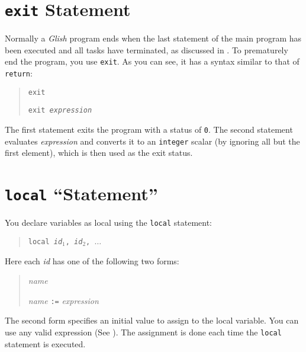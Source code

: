\section{{\tt exit} Statement}
\label{exit-stmt}


Normally a {\em Glish} program ends when the last statement of the main
program has been executed and all tasks have terminated, as discussed
in .   To prematurely
end the program, you use {\tt exit}. 
As you can see, it  has a syntax similar to that
of {\tt return}:
\begin{quote}
    {\tt exit}

    {\tt exit {\em expression}}
\end{quote}
The first statement exits the program with a status of {\tt 0}. The second
statement evaluates {\em expression} and converts it to an {\tt integer} scalar
(by ignoring all but the first element), which is then used as the
exit status.

\section{{\tt local} ``Statement''}
\label{local-stmt}
You declare variables as local using the {\tt local} statement:

\begin{quote}
    {\tt local {\em id$_1$}, {\em id$_2$}, $\ldots$}
\end{quote}
Here each {\em id} has one of the following two forms:
\begin{quote}
    {\em name}

    {\em name} {\tt :=} {\em expression}
\end{quote}
The second form specifies an initial value to assign to the local
variable.  You can use any valid expression (See ).
The assignment is done each time the {\tt local} statement is
executed.

